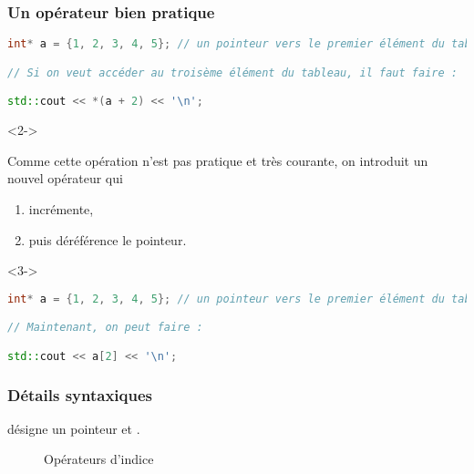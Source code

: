 \documentclass{cppcourses}
\begin{document}
\begin{frame}[fragile]

\frametitle{Un opérateur bien pratique}

\begin{example}

\begin{lstlisting}[language = c++]
int* a = {1, 2, 3, 4, 5}; // un pointeur vers le premier élément du tableau

// Si on veut accéder au troisème élément du tableau, il faut faire :

std::cout << *(a + 2) << '\n';
\end{lstlisting}

\begin{uncoverenv}<2->

Comme cette opération n'est pas pratique et très courante, on introduit un nouvel opérateur qui

\begin{enumerate}
    \item incrémente,
    \item puis déréférence le pointeur.
\end{enumerate}

\end{uncoverenv}

\begin{uncoverenv}<3->

\begin{lstlisting}[language = c++]
int* a = {1, 2, 3, 4, 5}; // un pointeur vers le premier élément du tableau

// Maintenant, on peut faire :

std::cout << a[2] << '\n';
\end{lstlisting}

\end{uncoverenv}

\end{example}

\end{frame}

\begin{frame}

\frametitle{Détails syntaxiques}

 désigne {un pointeur} et  .

\begin{figure}
\caption{Opérateurs d'indice}
\end{figure}


\end{frame}
\end{document}
